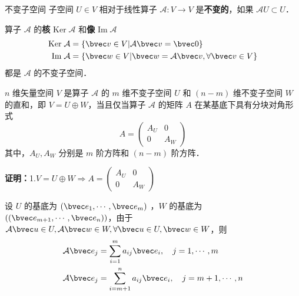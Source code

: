 
\begin{issues}
\issueTODO
\end{issues}

\begin{definition}{不变子空间}
子空间 $U\in V$ 相对于线性算子 $\mathcal{A}:V\rightarrow V$ 是\textbf{不变的}，如果 $\mathcal{A}U\subset U$．
\end{definition}
\begin{example}{}
算子 $\mathcal{A}$ 的\textbf{核} $\mathrm{Ker}\;\mathcal A$ 和\textbf{像} $\mathrm{Im}\;\mathcal{A}$
\begin{equation}
\begin{aligned}
\mathrm{Ker}\;\mathcal{A}&=\{\bvec v\in V|\mathcal{A}\bvec v=\bvec 0\}\\
\mathrm{Im}\;\mathcal{A}&=\{\bvec w\in V|\bvec w=\mathcal{A}\bvec v,\forall\bvec v\in V\}
\end{aligned}
\end{equation}
都是 $\mathcal A$ 的不变子空间．
\end{example}
\begin{theorem}{}
$n$ 维矢量空间 $V$ 是算子 $\mathcal{A}$ 的 $m$ 维不变子空间 $U$ 和 $(n-m)$ 维不变子空间 $W$ 的直和，即 $V=U\oplus W$，当且仅当算子 $\mathcal{A}$ 的矩阵 $A$ 在某基底下具有分块对角形式
\begin{equation}
A=\begin{pmatrix}
A_U&0\\
0&A_W
\end{pmatrix}
\end{equation}
其中，$A_U,A_W$ 分别是 $m$ 阶方阵和 $(n-m)$ 阶方阵．
\end{theorem}
\textbf{证明：}1.$
V=U\oplus W\Rightarrow A=\begin{pmatrix}
A_U&0\\
0&A_W
\end{pmatrix}
$

设 $U$ 的基底为 $(\bvec e_1,\cdots,\bvec e_m)$ ，$W$ 的基底为 $((\bvec e_{m+1},\cdots,\bvec e_n))$，由于 $\mathcal{A}\bvec u\in U, \mathcal{A}\bvec w\in W,\forall \bvec u\in U,\bvec w\in W$，则
\begin{equation}
\begin{aligned}
\mathcal{A}\bvec e_j&=\sum_{i=1}^m a_{ij}\bvec e_i,\quad j=1,\cdots ,m\\
\mathcal{A}\bvec e_j&=\sum_{i=m+1}^n a_{ij}\bvec e_i,\quad j=m+1,\cdots ,n
\end{aligned}
\end{equation}
